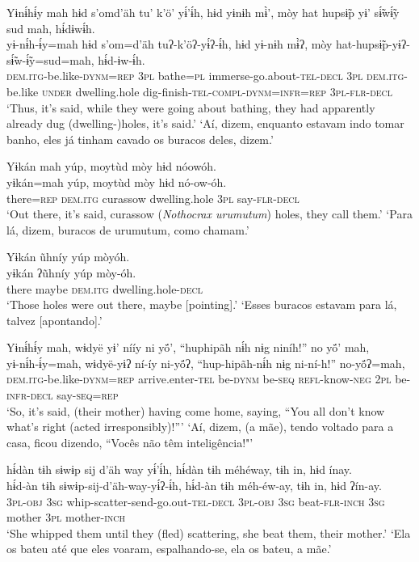 \documentclass[output=paper,
modfonts,nonflat
]{langsci/langscibook}
\begin{document}
\ea  Yɨnɨ́hɨ́y mah hɨd s’omd'äh tu’ k’ö’ yɨ́’ɨ́h, hɨd yɨnɨh mɨ̀’, mòy hat hupsɨ̃p yɨ’ sɨ̃́wɨ̃́y sud mah, hɨ́dɨwɨ́h.\\
\gll yɨ-nɨ́h-ɨ́y=mah hɨd s’om=d'äh tuʔ-k’öʔ-yɨ́ʔ-ɨ́h, hɨd yɨ-nɨh mɨ̀ʔ, mòy hat-hupsɨ̃p-yɨʔ-sɨ̃́w-ɨ̃́y=sud=mah, hɨ́d-ɨw-ɨ́h.\\
     \textsc{dem.itg-}be.like\textsc{-dynm=rep} \textsc{3pl} bathe\textsc{=pl} immerse-go.about\textsc{-tel-decl} \textsc{3pl} \textsc{dem.itg-}be.like \textsc{under} dwelling.hole dig-finish\textsc{-tel-compl-dynm=infr=rep} \textsc{3pl-flr-decl}\\
\glt ‘Thus, it’s said, while they were going about bathing, they had apparently already dug (dwelling-)holes, it’s said.'
\glt ‘Aí, dizem, enquanto estavam indo tomar banho, eles já tinham cavado os buracos deles, dizem.'
\z

\ea  Yɨkán mah yúp, moytùd mòy hɨd nóowóh.\\
\gll yɨkán=mah yúp, moytùd mòy hɨd nó-ow-óh.\\
     there\textsc{=rep} \textsc{dem.itg} curassow  dwelling.hole \textsc{3pl} say\textsc{-flr-decl}\\
\glt ‘Out there, it’s said, curassow (\textit{Nothocrax urumutum}) holes, they call them.'
\glt ‘Para lá, dizem, buracos de urumutum, como chamam.'
\z

\ea  Yɨkán ũhníy yúp mòyóh.\\
\gll yɨkán ʔũhníy yúp mòy-óh.\\
     there maybe \textsc{dem.itg} dwelling.hole\textsc{-decl}\\
\glt ‘Those holes were out there, maybe [pointing].'
\glt ‘Esses buracos estavam para lá, talvez [apontando].'
\z

\ea  Yɨnɨ́hɨ́y mah, wɨdyë yɨ’ nííy ni yö́’, “huphipãh nɨ́h nɨg niníh!” no yö́’ mah,\\
\gll yɨ-nɨ́h-ɨ́y=mah, wɨdyë-yɨʔ ní-íy ni-yö́ʔ, “hup-hipãh-nɨ́h nɨg ni-ní-h!” no-yö́ʔ=mah,\\
     \textsc{dem.itg-}be.like\textsc{-dynm=rep} arrive.enter\textsc{-tel} be\textsc{-dynm} be\textsc{-seq} \textsc{refl-}know\textsc{-neg} \textsc{2pl} be\textsc{-infr-decl} say\textsc{-seq=rep}\\
\glt ‘So, it’s said, (their mother) having come home, saying, “You all don’t know what’s right (acted irresponsibly)!”'
\glt ‘Aí, dizem, (a mãe), tendo voltado para a casa, ficou dizendo, “Vocês não têm inteligência!"'
\z

\newpage
\ea  hɨ́dàn tɨh sɨwɨp sij d’äh way yɨ́’ɨ́h, hɨ́dàn tɨh méhéway, tɨh in, hɨd ínay.\\
\gll hɨ́d-àn tɨh sɨwɨp-sij-d’äh-way-yɨ́ʔ-ɨ́h, hɨ́d-àn tɨh méh-éw-ay, tɨh in, hɨd ʔín-ay.\\
     \textsc{3pl-obj} \textsc{3sg} whip-scatter-send-go.out\textsc{-tel-decl} \textsc{3pl-obj} \textsc{3sg} beat\textsc{-flr-inch} \textsc{3sg} mother \textsc{3pl} mother\textsc{-inch}\\
\glt ‘She whipped them until they (fled) scattering, she beat them, their mother.'
\glt ‘Ela os bateu até que eles voaram, espalhando-se, ela os bateu, a mãe.'
\z
\end{document}
